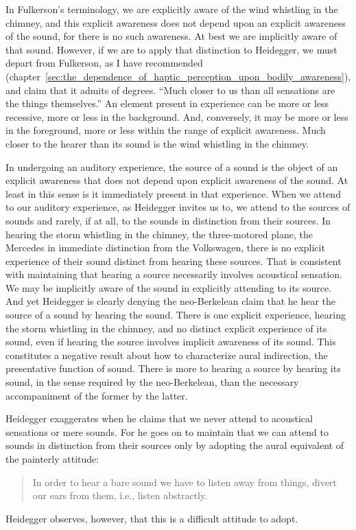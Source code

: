 In Fulkerson's \citeyearpar{Fulkerson:2014ek} terminology, we are explicitly aware of the wind whistling in the chimney, and this explicit awareness does not depend upon an explicit awareness of the sound, for there is no such awareness. At best we are implicitly aware of that sound. However, if we are to apply that distinction to Heidegger, we must depart from Fulkerson, as I have recommended (chapter~\ref{sec:the_dependence_of_haptic_perception_upon_bodily_awareness}), and claim that it admits of degrees. ``Much closer to us than all sensations are the things themselves.'' An element present in experience can be more or less recessive, more or less in the background. And, conversely, it may be more or less in the foreground, more or less within the range of explicit awareness. Much closer to the hearer than its sound is the wind whistling in the chimney.

In undergoing an auditory experience, the source of a sound is the object of an explicit awareness that does not depend upon explicit awareness of the sound. At least in this sense is it immediately present in that experience. When we attend to our auditory experience, as Heidegger invites us to, we attend to the sources of sounds and rarely, if at all, to the sounds in distinction from their sources. In hearing the storm whistling in the chimney, the three-motored plane, the Mercedes in immediate distinction from the Volkswagen, there is no explicit experience of their sound distinct from hearing these sources. That is consistent with maintaining that hearing a source necessarily involves acoustical sensation. We may be implicitly aware of the sound in explicitly attending to its source. And yet Heidegger is clearly denying the neo-Berkelean claim that he hear the source of a sound by hearing the sound. There is one explicit experience, hearing the storm whistling in the chimney, and no distinct explicit experience of its sound, even if hearing the source involves implicit awareness of its sound. This constitutes a negative result about how to characterize aural indirection, the presentative function of sound. There is more to hearing a source by hearing its sound, in the sense required by the neo-Berkelean, than the necessary accompaniment of the former by the latter.

Heidegger exaggerates when he claims that we never attend to acoustical sensations or mere sounds. For he goes on to maintain that we can attend to sounds in distinction from their sources only by adopting the aural equivalent of the painterly attitude:
\begin{quote}
    In order to hear a bare sound we have to listen away from things, divert our ears from them, i.e., listen abstractly. \citep[152]{Heidegger:1935uq}
\end{quote}
Heidegger observes, however, that this is a difficult attitude to adopt. 

